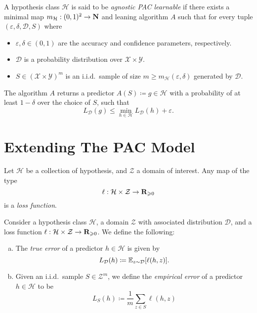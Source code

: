 \begin{definition}
\label{def:agnostic-pac-learning-model}
A hypothesis class \(\mathcal{H}\) is said to be \emph{agnostic PAC learnable}
if there exists a minimal map \(m_{\mathcal{H}}: (0, 1)^2 \to \mathbf{N}\) and leaning
algorithm \(A\) such that for every tuple \((\varepsilon, \delta,
\mathcal{D}, S)\) where
\begin{itemize}\setlength\itemsep{0em}
\item \(\varepsilon, \delta \in (0, 1)\) are the accuracy and confidence
  parameters, respectively.
\item \(\mathcal{D}\) is a probability distribution over
  \(\mathcal{X} \times \mathcal{Y}\).
\item \(S \in (\mathcal{X} \times \mathcal{Y})^m\) is an i.i.d.~sample of size
  \(m \geq m_{\mathcal{H}}(\varepsilon, \delta)\) generated by \(\mathcal{D}\).
\end{itemize}
The algorithm \(A\) returns a predictor \(A(S) \coloneq g \in \mathcal{H}\) with
a probability of at least \(1 - \delta\) over the choice of \(S\), such that
\[
L_{\mathcal{D}}(g) \leq \min_{h \in \mathcal{H}} L_{\mathcal{D}}(h) + \varepsilon.
\]
\end{definition}

\section{Extending The PAC Model}

\begin{definition}
\label{def:generalised-loss-function}
Let \(\mathcal{H}\) be a collection of hypothesis, and \(\mathcal{Z}\) a domain
of interest. Any map of the type
\[
\ell: \mathcal{H} \times \mathcal{Z} \to \mathbf{R}_{\geqslant 0}
\]
is a \emph{loss function}.
\end{definition}

\begin{definition}
\label{def:generalised-error-functions}
Consider a hypothesis class \(\mathcal{H}\), a domain \(\mathcal{Z}\) with
associated distribution \(\mathcal{D}\), and a loss function \(\ell: \mathcal{H}
\times \mathcal{Z} \to \mathbf{R}_{\geqslant 0}\). We define the following:
\begin{enumerate}[(a)]\setlength\itemsep{0em}
\item The \emph{true error} of a predictor \(h \in \mathcal{H}\) is given by
  \[
  L_{\mathcal{D}}(h) \coloneq \operatorname{\mathbb{E}}_{z \sim \mathcal{D}}[\ell(h, z)].
  \]
\item Given an i.i.d.~sample \(S \in \mathcal{Z}^m\), we define the \emph{empirical
    error} of a predictor \(h \in \mathcal{H}\) to be
  \[
  L_S(h) \coloneq \frac{1}{m} \sum_{z \in S} \ell(h, z)
  \]
\end{enumerate}
\end{definition}

